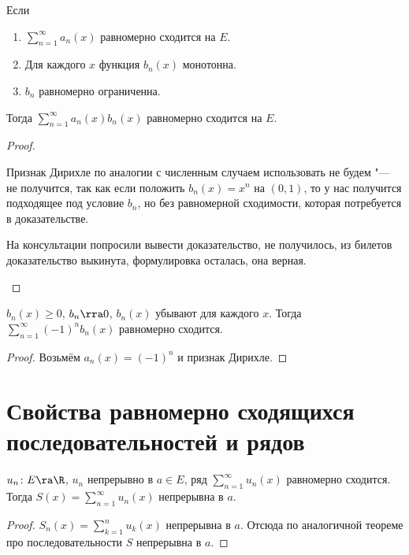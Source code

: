 \begin{theorem}
	Если \nopagebreak[3]
	\begin{enumerate}
	\item
		$\sum_{n=1}^\infty a_n(x)$ равномерно сходится на $E$.

	\item
		Для каждого $x$ функция $b_n(x)$ монотонна.

	\item
		$b_n$ равномерно ограниченна.
	\end{enumerate}
	Тогда $\sum_{n=1}^\infty a_n(x) b_n(x)$ равномерно сходится на $E$.
\end{theorem}
\begin{proof}
	\begin{Rem}
		Признак Дирихле по аналогии с численным случаем использовать
		не будем "--- не получится, так как если положить $b_n(x)=x^n$ на $(0,1)$,
		то у нас получится подходящее под условие $b_n$, но без равномерной сходимости,
		которая потребуется в доказательстве.

		На консультации попросили вывести доказательство, не получилось,
		из билетов доказательство выкинута, формулировка осталась, она верная.
	\end{Rem}
\end{proof}

\begin{theorem}
	$b_n(x) \ge 0$, $b_n \rra 0$, $b_n(x)$ убывают для каждого $x$.
	Тогда $\sum_{n=1}^\infty (-1)^n b_n(x)$ равномерно сходится.
\end{theorem}
\begin{proof}
	Возьмём $a_n(x) = (-1)^n$ и признак Дирихле.
\end{proof}

\section[Св-ва равномерно сход-ся посл-тей и рядов]{Свойства равномерно сходящихся последовательностей и рядов}

\begin{theorem}
	$u_n\colon E \ra \R$, $u_n$ непрерывно в $a \in E$, ряд $\sum_{n=1}^\infty u_n(x)$ равномерно сходится.
	Тогда $S(x) = \sum_{n=1}^\infty u_n(x)$ непрерывна в $a$.
\end{theorem}
\begin{proof}
	$S_n(x) = \sum_{k=1}^n u_k(x)$ непрерывна в $a$.
	Отсюда по аналогичной теореме про последовательности $S$ непрерывна в $a$.
\end{proof}

